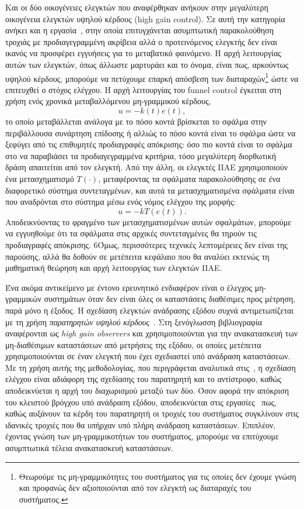 Και οι δύο οικογένειες ελεγκτών που αναφέρθηκαν ανήκουν στην μεγαλύτερη οικογένεια ελεγκτών υψηλού κέρδους (\textlatin{high gain control}). Σε αυτή την κατηγορία ανήκει και η εργασία~\cite{bullinger2005adaptive}, στην οποία επιτυγχάνεται ασυμπτωτική παρακολούθηση τροχιάς με προδιαγεγραμμένη ακρίβεια αλλά ο προτεινόμενος ελεγκτής δεν είναι ικανός να προσφέρει εγγυήσεις για το μεταβατικό φαινόμενο. Η αρχή λειτουργίας αυτών των ελεγκτών, όπως άλλωστε μαρτυράει και το όνομα, είναι πως, αρκούντως υψηλού κέρδους, μπορούμε να πετύχουμε επαρκή απόσβεση των διαταραχών\footnote{Θεωρούμε τις μη-γραμμικότητες του συστήματος για τις οποίες δεν έχουμε γνώση και προφανώς δεν αξιοποιούνται από τον ελεγκτή ως διαταραχές του συστήματος.} ώστε να επιτευχθεί ο στόχος ελέγχου. Η αρχή λειτουργίας του \textlatin{funnel control} έγκειται στη χρήση ενός χρονικά μεταβαλλόμενου μη-γραμμικού κέρδους, 
\[
    u = - k(t) e(t),
\]
το οποίο μεταβάλλεται ανάλογα με το πόσο κοντά βρίσκεται το σφάλμα στην περιβάλλουσα συνάρτηση επίδοσης ή αλλιώς το πόσο κοντά είναι το σφάλμα ώστε να ξεφύγει από τις επιθυμητές προδιαγραφές απόκρισης: όσο πιο κοντά είναι το σφάλμα στο να παραβιάσει τα προδιαγεγραμμένα κριτήρια, τόσο μεγαλύτερη διορθωτική δράση απαιτείται από τον ελεγκτή. Από την άλλη, οι ελεγκτές ΠΑΕ χρησιμοποιούν ένα μετασχηματισμό $T(\cdot)$, μεταφέροντας τα σφάλματα παρακολούθησης σε ένα διαφορετικό σύστημα συντεταγμένων, και αυτά τα μετασχηματισμένα σφάλματα είναι που αναδρόνται στο σύστημα μέσω ενός νόμος ελέγχου της μορφής:
\[
    u = - k T(e(t)).
\]
Αποδεικνύοντας το φραγμένο των μετασχηματισμένων αυτών σφαλμάτων, μπορούμε να εγγυηθούμε ότι τα σφάλματα στις αρχικές συντεταγμένες θα τηρούν τις προδιαγραφές απόκρισης. 6Όμως, περισσότερες τεχνικές λεπτομέρειες δεν είναι της παρούσης, αλλά θα δοθούν σε μετέπειτα κεφάλαιο που θα αναλύει εκτενώς τη μαθηματική θεώρηση και αρχή λειτουργίας των ελεγκτών ΠΑΕ.

Ένα ακόμα αντικείμενο με έντονο ερευνητικό ενδιαφέρον είναι ο έλεγχος μη-γραμμικών συστημάτων όταν δεν είναι όλες οι καταστάσεις διαθέσιμες προς μέτρηση, παρά μόνο η έξοδος. Η σχεδίαση ελεγκτών ανάδρασης εξόδου συχνά αντιμετωπίζεται με τη χρήση \emph{παρατηρητών υψηλού κέρδους}~\cite{khalil2008high,Khalil2013}. Στη ξενόγλωσση βιβλιογραφία αναφέρονται ως \textlatin{\emph{high gain observers}} και χρησιμοποιούνται για την ανακατασκευή των μη-διαθέσιμων καταστάσεων από μετρήσεις της εξόδου, οι οποίες μετέπειτα χρησιμοποιούνται σε έναν ελεγκτή που έχει σχεδιαστεί υπό ανάδραση καταστάσεων. Με τη χρήση αυτής της μεθοδολογίας, που περιγράφεται αναλυτικά στις~\cite{khalil1996noninear,atassi2001separation,atassi1999separation}, η σχεδίαση ελέγχου είναι αδιάφορη της σχεδίασης του παρατηρητή και το αντίστροφο, καθώς αποδεικνύεται η αρχή του διαχωρισμού μεταξύ των δύο. Όσον αφορά την απόκριση του κλειστού βρόγχου υπό ανάδραση εξόδου, αποδεικνύεται στις εργασίες~\cite{atassi2001separation,atassi1999separation} πως, καθώς αυξάνουν τα κέρδη του παρατηρητή οι τροχιές του συστήματος συγκλίνουν στις ιδανικές τροχιές που θα υπήρχαν υπό πλήρη ανάδραση καταστάσεων. Επιπλέον, έχοντας γνώση των μη-γραμμικοτήτων του συστήματος, μπορούμε να επιτύχουμε ασυμπτωτικά τέλεια ανακατασκευή καταστάσεων.


